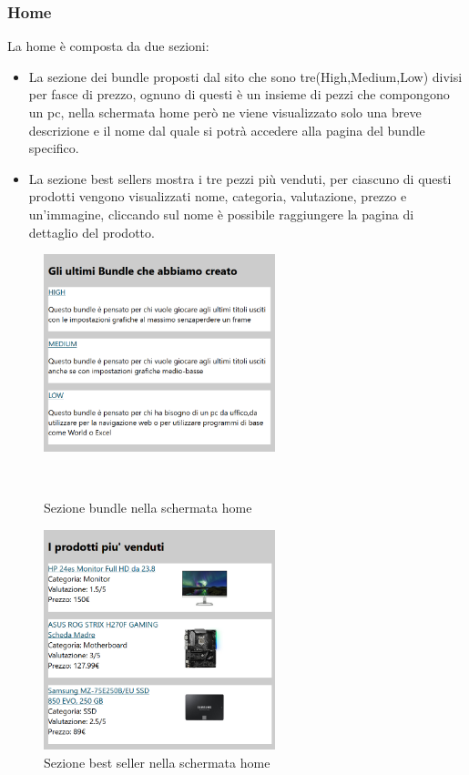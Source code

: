 \subsubsection{Home}
La home è composta da due sezioni:
\begin{itemize}
	\item La sezione dei bundle proposti dal sito che sono tre(High,Medium,Low) divisi per fasce di prezzo, ognuno di questi è un insieme di pezzi che compongono un pc, nella schermata home però ne viene visualizzato solo una breve descrizione e il nome dal quale si potrà accedere alla pagina del bundle specifico.
	\item La sezione best sellers mostra i tre pezzi più venduti, per ciascuno di questi prodotti vengono visualizzati nome, categoria, valutazione, prezzo e un'immagine, cliccando sul nome è possibile raggiungere la pagina di dettaglio del prodotto.
\end{itemize}
\begin{figure}[h!]
	\label{bundle} 
	\centering 
	\includegraphics[width=0.6\textwidth]{immagini/Bundle.png}
	\caption{Sezione bundle nella schermata home} 
	\mbox{} \\
\end{figure}
\begin{figure}[h!]
	\label{bs} 
	\centering 
	\includegraphics[width=0.6\textwidth]{immagini/bs.png}
	\caption{Sezione best seller nella schermata home} 
\end{figure}
\mbox{} \\

